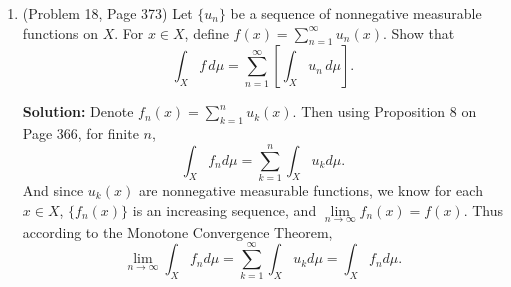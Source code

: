 \documentclass{article}%
\begin{document}
\begin{enumerate}
\item (Problem 18, Page 373)  Let $\{u_n\}$ be a sequence of nonnegative measurable functions on $X$.  For $x\in X$, define $f(x) = \sum_{n=1}^{\infty} u_n(x)$.  Show that \[
\int_X f \, d\mu = \sum_{n=1}^{\infty} \left[\int_X u_n \, d\mu \right].\]


\smallskip
\textbf{Solution:}
Denote $f_n(x) = \sum\limits_{k=1}^{n}u_k(x) $. Then using Proposition 8 on Page 366, for finite $n$,
$$
\int_{X}f_n d\mu = \sum_{k=1}^{n}\int_{X}u_kd\mu.
$$
And since $u_k(x)$ are nonnegative measurable functions, we know for each $x\in X$, $\{f_n(x)\}$ is an increasing sequence, and $\lim\limits_{n\to\infty}f_n(x) = f(x) $. Thus according to the Monotone Convergence Theorem, 
$$
\lim_{n\to\infty}\int_{X}f_n d\mu = \sum_{k=1}^{\infty}\int_{X}u_k d\mu = \int_{X}f_n d\mu.
$$

\end{enumerate}
\end{document}
